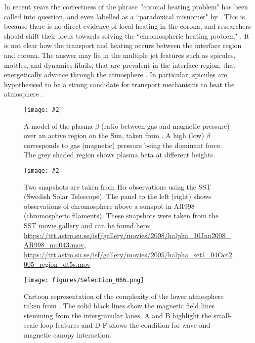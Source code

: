 \documentclass[12pt]{ociamthesis}
\newcommand{\mfig}[4]{
  \begin{figure}
  \begin{center}
  \texttt{[image: \#2]}
  \caption{#3}
  \label{#4}
  \end{center}
  \end{figure}}
\begin{document}
%
In recent years the correctness of the phrase ''coronal heating problem" has been called into question, and even labelled as a ``paradoxical misnomer" by \cite{Aschwanden2007ApJ}. This is because there is no direct evidence of local heating in the corona, and researchers should shift their focus towards solving the ``chromospheric heating problem" \citep{Aschwanden2007ApJ}. It is not clear how the transport and heating occurs between the interface region and corona. The answer may lie in the multiple jet features such as spicules, mottles, and dynamics fibrils, that are prevalent in the interface region, that energetically advance through the atmosphere \citep{Tsiropoula2012}. In particular, spicules are hypothesised to be a strong candidate for transport mechanisms to heat the atmosphere \citep{Kudoh1999ApJ514493K, Pontieu2007PASJ, Kudoh2008IAUS247195K, Martinez-Sykora2017,Moore2011ApJ731L18M, Pontieu2017ApJ, Samanta2019Sci, Zuo2019AcASn, Bale2019Natur}.    
\mfig{0.725}{figures/Selection_067.png}{A model of the plasma $\beta$ (ratio between gas and magnetic pressure) over an active region on the Sun, taken from \cite{Gary2001SoPh20371G}. A high (low) $\beta$ corresponds to gas (magnetic) pressure being the dominant force. The grey shaded region shows plasma beta at different heights.}{beta_profile_sun}
\mfig{1}{figures/messy_chrom.png}{Two snapshots are taken from H$\alpha$ observations using the SST (Swedish Solar Telescope). The panel to the left (right) shows observations of chromosphere above a sunspot in AR998  (chromospheric filaments). These snapshots were taken from the SST movie gallery and can be found here: \url{https://ttt.astro.su.se/isf/gallery/movies/2008/halpha_10Jun2008_AR998_mu043.mov}, \url{https://ttt.astro.su.se/isf/gallery/movies/2005/halpha_set1_04Oct2005_region_dt5s.mov}}{messy_chromo}
\begin{sidewaysfigure}[ht]
    \texttt{[image: figures/Selection\_066.png]}
    \caption{Cartoon representation of the complexity of the lower atmosphere taken from \cite{Wedemeyer2009SSRv144317W}. The solid black lines show the magnetic field lines stemming from the intergranular lanes. A and B highlight the small-scale loop features and D-F shows the condition for wave and magnetic canopy interaction.}
    \label{fig:chromo_Cart}
\end{sidewaysfigure}
\end{document}
